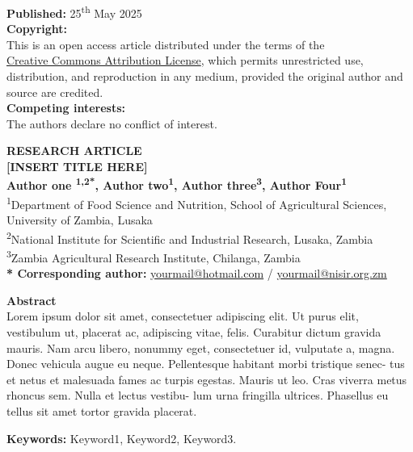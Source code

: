 \documentclass[11pt]{jabs}
\begin{document}
\begin{minipage}{\textwidth}
\begin{minipage}[t]{0.35\textwidth}
\begin{leftinfobox}
      \textbf{Published:} 25\textsuperscript{th} May 2025 \\[0.5em]

      \textbf{Copyright:} \\
      {\small\faCopyright} This is an open access article distributed under the terms of the \\
      \href{https://creativecommons.org/licenses/by/4.0/}{Creative Commons Attribution License}, which permits unrestricted use, distribution, and reproduction in any medium, provided the original author and source are credited. \\[0.5em]

      \textbf{Competing interests:} \\
      The authors declare no conflict of interest.
    \end{leftinfobox}
  \end{minipage}%
  \hfill
  \begin{minipage}[t]{0.62\textwidth}
    \vspace{0pt}
    \textbf{RESEARCH ARTICLE} \\[0.6em]

    {\Large\bfseries [INSERT TITLE HERE]} \\[1em]

    \small
    \textbf{Author one \textsuperscript{1,2*}, Author two\textsuperscript{1}, Author three\textsuperscript{3}, Author Four\textsuperscript{1}} \\[0.5em]

    \textsuperscript{1}Department of Food Science and Nutrition, School of Agricultural Sciences, University of Zambia, Lusaka \\
    \textsuperscript{2}National Institute for Scientific and Industrial Research, Lusaka, Zambia \\
    \textsuperscript{3}Zambia Agricultural Research Institute, Chilanga, Zambia \\[0.5em]

    \textbf{* Corresponding author:} \href{mailto:yourmail@hotmail.com}{yourmail@hotmail.com} / \href{mailto:yourmail@nisir.org.zm}{yourmail@nisir.org.zm}

    \vspace{1em}
    \normalsize
    \textbf{Abstract} \\[0.25em]
    \justifying
    \sloppy
    Lorem ipsum dolor sit amet, consectetuer adipiscing elit. Ut
  purus elit, vestibulum ut, placerat ac, adipiscing vitae, felis.
  Curabitur dictum gravida mauris. Nam arcu libero, nonummy
  eget, consectetuer id, vulputate a, magna. Donec vehicula
  augue eu neque. Pellentesque habitant morbi tristique senec-
  tus et netus et malesuada fames ac turpis egestas. Mauris ut
  leo. Cras viverra metus rhoncus sem. Nulla et lectus vestibu-
  lum urna fringilla ultrices. Phasellus eu tellus sit amet tortor
  gravida placerat.

    \vspace{1em}
    \textbf{Keywords:} Keyword1, Keyword2, Keyword3.
  \end{minipage}

\end{minipage}
\end{document}
